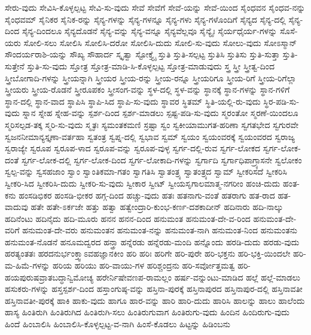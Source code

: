 ಸೇರು-ವುದು
ಸೇವಿಸಿ-ಕೊಳ್ಳಲ್ಪಟ್ಟ
ಸೇವಿ-ಸು-ವುದು
ಸೇವೆ
ಸೇವೆಗೆ
ಸೇವೆ-ಯನ್ನು
ಸೇವೆ-ಯಿಂದ
ಸೈಂಧವನ
ಸೈಂಧವ-ನನ್ನು
ಸೈಂಧವಮ್
ಸೈನಿಕರ
ಸೈನಿಕ-ರನ್ನು
ಸೈನ್ಯ-ಗಳನ್ನು
ಸೈನ್ಯ-ಗಳನ್ನೂ
ಸೈನ್ಯ-ಗಳು
ಸೈನ್ಯ-ಗಳೊಂದಿಗೆ
ಸೈನ್ಯದ
ಸೈನ್ಯ-ದಲ್ಲಿ
ಸೈನ್ಯ-ದಿಂದ
ಸೈನ್ಯ-ದಿಂದಲೂ
ಸೈನ್ಯದೊಡನೆ
ಸೈನ್ಯ-ವನ್ನು
ಸೈನ್ಯ-ವನ್ನೂ
ಸೈನ್ಯವೆಲ್ಲವೂ
ಸೈನ್ಯೈಃ
ಸೈರ್ಯಧೈರ್ಯ-ಗಳನ್ನು
ಸೊಸೆ-ಯರು
ಸೋಲಿ-ಸಲು
ಸೋಲಿಸಿ
ಸೋಲಿಸಿ-ದರೋ
ಸೋಲಿಸಿ-ದುದು
ಸೋಲಿ-ಸು-ವುದು
ಸೋಲು-ವುದು
ಸೋಽಸ್ಮಾನ್
ಸೌಂದರ್ಯರಾಶಿ-ಯನ್ನು
ಸೌಖ್ಯ
ಸೌಹಾರ್ದ
ಸ್ಕೃತ್ವಾ
ಸ್ಟೋಕ್ತ್ಯೈ
ಸ್ತುತಿ
ಸ್ತುತಿ-ಸಲ್ಪಟ್ಟ
ಸ್ತುತಿಸಿ
ಸ್ತುತಿಸು
ಸ್ತುತಿ-ಸುತ್ತಾ
ಸ್ತುತಿ-ಸುತ್ತೇನೆ
ಸ್ತುತಿ-ಸು-ವುದು
ಸ್ತೋತ್ರ
ಸ್ತೋತ್ರ-ಮಾಡಿ-ಸಿ-ಕೊಳ್ಳಲ್ಪಟ್ಟ
ಸ್ತೋತ್ರ-ಮಾಡುವುದು
ಸ್ತ್ರ
ಸ್ತ್ರೀ
ಸ್ತ್ರೀತ್ವ-ದಿಂದ
ಸ್ತ್ರೀಬೋಗಾದಿ-ಗಳನ್ನು
ಸ್ತ್ರೀಯನ್ನಾಗಿ
ಸ್ತ್ರೀಯರ
ಸ್ತ್ರೀಯ-ರನ್ನು
ಸ್ತ್ರೀಯ-ರನ್ನೂ
ಸ್ತ್ರೀಯರಿಗೂ
ಸ್ತ್ರೀಯ-ರಿಗೆ
ಸ್ತ್ರೀಯ-ರಿಗೆಲ್ಲಾ
ಸ್ತ್ರೀಯರು
ಸ್ತ್ರೀಯ-ರೊಡನೆ
ಸ್ತ್ರೀರೂಪಕಂ
ಸ್ತ್ರೀಸಂಗ-ವನ್ನು
ಸ್ಥಳ-ದಲ್ಲಿ
ಸ್ಥಳ-ವನ್ನು
ಸ್ಥಾನಕ್ಕೆ
ಸ್ಥಾನ-ಗಳನ್ನು
ಸ್ಥಾನ-ಗಳಿಗೆ
ಸ್ಥಾನ-ದಲ್ಲಿ
ಸ್ಥಾನ-ವಾದ
ಸ್ಥಾಪಿಸಿ
ಸ್ಥಾಪಿ-ಸಿದ
ಸ್ಥಾಪಿ-ಸು-ವುದು
ಸ್ಥಾವರ
ಸ್ಥಿತಮ್
ಸ್ಥಿತಿ-ಯಲ್ಲಿ-ರು-ವುದು
ಸ್ಥಿರ-ಪಡಿ-ಸು-ವುದು
ಸ್ನಾನ
ಸ್ನೇಹ
ಸ್ನೇಹ-ವನ್ನು
ಸ್ಪರ್ಶ-ದಿಂದ
ಸ್ಪರ್ಶ-ಮಾಡಲು
ಸ್ಪಷ್ಟ-ಪಡಿ-ಸು-ವುದು
ಸ್ಮರಂತೋ
ಸ್ಮರಣೆ-ಯಿಂದಲೂ
ಸ್ಮರಿಸಲ್ಪಡ-ತಕ್ಕ
ಸ್ಮರಿ-ಸು-ವುದು
ಸ್ಮೃತಃ
ಸ್ಯಮಂತಕಮಣಿ
ಸ್ರಷ್ಟಾ
ಸ್ವಂ
ಸ್ವಕೀಯಾಮುಗತ-ಹರಿಣಾ
ಸ್ವಗತಭೇದ
ಸ್ವಗುರವೇ
ಸ್ವಜನನೀಮಾನ್ಯಸ್ತೃಣಾ-ವರ್ತಹಾ
ಸ್ವತಂತ್ರ
ಸ್ವಪ್ನ-ದಲ್ಲಿ
ಸ್ವಭಾವ
ಸ್ವಮ್
ಸ್ವಯಂ
ಸ್ವಯಂವರಕ್ಕೆ
ಸ್ವಯಂವರದ
ಸ್ವರಾಜ್ಯ
ಸ್ವರಾಜ್ಯೇ
ಸ್ವರೂಪ
ಸ್ವರೂಪ-ಳಾದ
ಸ್ವರೂಪ-ವನ್ನು
ಸ್ವರೂಪ-ವುಳ್ಳ
ಸ್ವರ್ಗ-ದಲ್ಲಿ-ರುವ
ಸ್ವರ್ಗ-ಲೋಕದ
ಸ್ವರ್ಗ-ಲೋಕ-ದಂತೆ
ಸ್ವರ್ಗ-ಲೋಕ-ದಲ್ಲಿ
ಸ್ವರ್ಗ-ಲೋಕ-ದಿಂದ
ಸ್ವರ್ಗ-ಲೋಕಾದಿ-ಗಳನ್ನು
ಸ್ವರ್ಗಾದಿ
ಸ್ವರ್ಗಾಧಿಪಾಗ್ರ್ಯಾಸನೇ
ಸ್ವಲೋಕಂ
ಸ್ವಲ್ಪ-ವನ್ನು
ಸ್ವಸಹಜಾಂ
ಸ್ವಾಂ
ಸ್ವಾಂತಿಕಮಾ-ಗತಂ
ಸ್ವಾಗತಿಸಿ
ಸ್ವಾತಂತ್ರ್ಯ
ಸ್ವಾತಂತ್ರ್ಯದ
ಸ್ವಾಮ್
ಸ್ವೀಕರಿಸದೆ
ಸ್ವೀಕರಿಸಿ
ಸ್ವೀಕರಿ-ಸಿದ
ಸ್ವೀಕರಿಸಿ-ದುದು
ಸ್ವೀಕರಿ-ಸು-ವುದು
ಸ್ವೀಕಾರ
ಸ್ವೀಟ್
ಸ್ವೀಯಸೃಗಾಲಮಾತ್ಮ-ನಗರೀಂ
ಹಂಚಿ-ದುದು
ಹಂತ-ಕನು
ಹಂಸಡಿಭಿಕರ
ಹಂಸಡಿ-ಭೀಕರ
ಹಗ್ಗ-ದಿಂದ
ಹಚ್ಚು-ವುದು
ಹತಃ
ಹತನಾಗು-ವಂತೆ
ಹತರಾಗು
ಹತ-ರಾದ
ಹತ-ವಾದುವು
ಹತೇ
ಹತೇ-ಽರ್ಕಜೇ
ಹತ್ತು
ಹತ್ವಾ
ಹತ್ವೇಂದ್ರಾರಿ-ಕುಂಭ-ಕರ್ಣ-ದಶಕಾದೀನ್
ಹದಿನಾರು
ಹದಿ-ನಾಲ್ಕು
ಹದಿನೆಂಟು
ಹದಿನೈದು
ಹದಿ-ಮೂರು
ಹನನ
ಹನನ-ದಿಂದ
ಹನುಮಂತ
ಹನುಮಂತ-ದೇ-ವ-ರಿಂದ
ಹನುಮಂತ-ದೇ-ವರಿಗೆ
ಹನುಮಂತ-ದೇ-ವರು
ಹನುಮಂತನ
ಹನುಮಂತ-ನನ್ನು
ಹನುಮಂತ-ನಾಗಿ
ಹನುಮಂತ-ನಿಂದ
ಹನುಮಂತನು
ಹನುಮಂತ-ನೊಡನೆ
ಹನೂಮದ್ವರದ
ಹನ್ತ್ರಾ
ಹನ್ನೆರಡು
ಹನ್ನೆರಡು-ಮಂದಿ
ಹನ್ನೊಂದು
ಹರಡಿ-ದುದು
ಹರಡು-ವುದು
ಹರತ್ಯಂತತಃ
ಹರದನುರ್ಭಂಕ್ತ್ವಾಽವಹಜ್ಞಾನಕೀಂ
ಹರಿ
ಹರಿಃ
ಹರಿಗೇ
ಹರಿ-ಪುರೇ
ಹರಿ-ಭಕ್ತನು
ಹರಿ-ಭಕ್ತಿ-ಯಿಂದಲೇ
ಹರಿ-ಮ-ಹಿಮೆ-ಗಳನ್ನು
ಹರಿಯ
ಹರಿಯು
ಹರಿ-ವಾಯು-ಗಳ
ಹರಿಶ್ಚಂದ್ರನು
ಹರಿ-ಸರ್ವೋತ್ತಮತ್ವ
ಹರಿ-ಹಯಪುರುಷವ್ರಾತಬದ್ಧಾನ್ವಿಮೋಚ್ಯ
ಹರೇರ್ನಿಷೇವಣಪ-ರಾಮಲ್ಲಂ
ಹರ್ಷ-ವನ್ನುಂಟು-ಮಾಡಿದ
ಹಲ್ಲೆ
ಹಲ್ಲೆ-ಮಾಡಲು
ಹಸುಕರು-ಗಳನ್ನು
ಹಸ್ತಸ್ಪರ್ಶ-ದಿಂದ
ಹಸ್ತಾಂಗುಷ್ಠ-ವನ್ನು
ಹಸ್ತಿನಾ-ಪುರಕ್ಕೆ
ಹಸ್ತಿನಾಪುರದ
ಹಸ್ತಿನಾಪುರ-ದಲ್ಲಿ
ಹಸ್ತಿನಾವತೀ
ಹಸ್ತಿನಾವತೀ-ಪುರಕ್ಕೆ
ಹಾಕಿ
ಹಾಕು-ವುದು
ಹಾಗೂ
ಹಾರ-ವನ್ನು
ಹಾರಿ
ಹಾರಿ-ದುದು
ಹಾರಿಸಿ
ಹಾಲನ್ನು
ಹಾಲು
ಹಾಲೆಂದು
ಹಾಸ್ಯ
ಹಿಂತಿರುಗಿ
ಹಿಂತಿರುಗಿದ
ಹಿಂತಿರುಗಿ-ಸಲು
ಹಿಂತಿರುಗುವಾಗ
ಹಿಂತಿರುಗು-ವುದು
ಹಿಂದಿನ
ಹಿಂದಿರುಗು-ವುದು
ಹಿಂದೆ
ಹಿಂಬಾಲಿಸಿ
ಹಿಂಬಾಲಿಸಿ-ಕೊಳ್ಳಲ್ಪಟ್ಟ-ವ-ನಾಗಿ
ಹಿಂಸೆ-ಕೊಡಲು
ಹಿಟ್ಟನ್ನು
ಹಿಡಿಂಬನು
